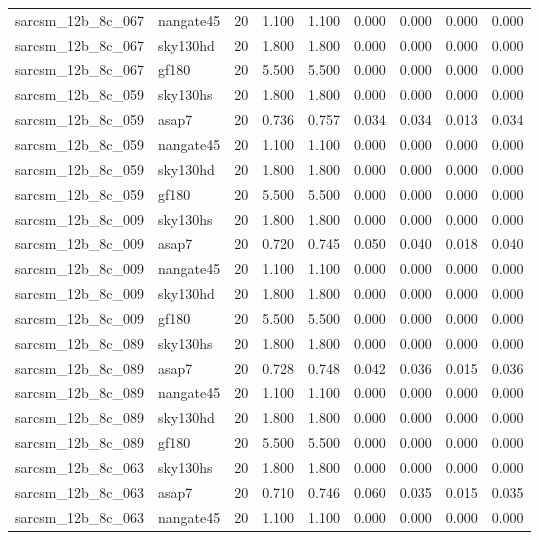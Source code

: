 \begin{tabular}{llrrrrrrr}
sarcsm\_12b\_8c\_067 & nangate45 & 20 & 1.100 & 1.100 & 0.000 & 0.000 & 0.000 & 0.000 \\
sarcsm\_12b\_8c\_067 & sky130hd & 20 & 1.800 & 1.800 & 0.000 & 0.000 & 0.000 & 0.000 \\
sarcsm\_12b\_8c\_067 & gf180 & 20 & 5.500 & 5.500 & 0.000 & 0.000 & 0.000 & 0.000 \\
sarcsm\_12b\_8c\_059 & sky130hs & 20 & 1.800 & 1.800 & 0.000 & 0.000 & 0.000 & 0.000 \\
sarcsm\_12b\_8c\_059 & asap7 & 20 & 0.736 & 0.757 & 0.034 & 0.034 & 0.013 & 0.034 \\
sarcsm\_12b\_8c\_059 & nangate45 & 20 & 1.100 & 1.100 & 0.000 & 0.000 & 0.000 & 0.000 \\
sarcsm\_12b\_8c\_059 & sky130hd & 20 & 1.800 & 1.800 & 0.000 & 0.000 & 0.000 & 0.000 \\
sarcsm\_12b\_8c\_059 & gf180 & 20 & 5.500 & 5.500 & 0.000 & 0.000 & 0.000 & 0.000 \\
sarcsm\_12b\_8c\_009 & sky130hs & 20 & 1.800 & 1.800 & 0.000 & 0.000 & 0.000 & 0.000 \\
sarcsm\_12b\_8c\_009 & asap7 & 20 & 0.720 & 0.745 & 0.050 & 0.040 & 0.018 & 0.040 \\
sarcsm\_12b\_8c\_009 & nangate45 & 20 & 1.100 & 1.100 & 0.000 & 0.000 & 0.000 & 0.000 \\
sarcsm\_12b\_8c\_009 & sky130hd & 20 & 1.800 & 1.800 & 0.000 & 0.000 & 0.000 & 0.000 \\
sarcsm\_12b\_8c\_009 & gf180 & 20 & 5.500 & 5.500 & 0.000 & 0.000 & 0.000 & 0.000 \\
sarcsm\_12b\_8c\_089 & sky130hs & 20 & 1.800 & 1.800 & 0.000 & 0.000 & 0.000 & 0.000 \\
sarcsm\_12b\_8c\_089 & asap7 & 20 & 0.728 & 0.748 & 0.042 & 0.036 & 0.015 & 0.036 \\
sarcsm\_12b\_8c\_089 & nangate45 & 20 & 1.100 & 1.100 & 0.000 & 0.000 & 0.000 & 0.000 \\
sarcsm\_12b\_8c\_089 & sky130hd & 20 & 1.800 & 1.800 & 0.000 & 0.000 & 0.000 & 0.000 \\
sarcsm\_12b\_8c\_089 & gf180 & 20 & 5.500 & 5.500 & 0.000 & 0.000 & 0.000 & 0.000 \\
sarcsm\_12b\_8c\_063 & sky130hs & 20 & 1.800 & 1.800 & 0.000 & 0.000 & 0.000 & 0.000 \\
sarcsm\_12b\_8c\_063 & asap7 & 20 & 0.710 & 0.746 & 0.060 & 0.035 & 0.015 & 0.035 \\
sarcsm\_12b\_8c\_063 & nangate45 & 20 & 1.100 & 1.100 & 0.000 & 0.000 & 0.000 & 0.000 \\

\end{tabular}
